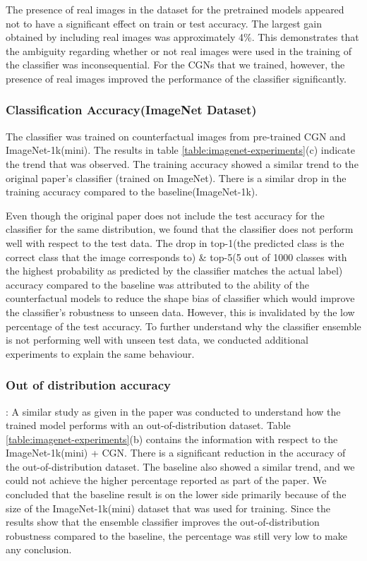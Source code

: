 The presence of real images in the dataset for the pretrained models appeared not to have a significant effect on train or test accuracy. The largest gain obtained by including real images was approximately 4\%. This demonstrates that the ambiguity regarding whether or not real images were used in the training of the classifier was inconsequential. For the CGNs that we trained, however, the presence of real images improved the performance of the classifier significantly. 


\subsubsection{Classification Accuracy(ImageNet Dataset)}

The classifier was trained on counterfactual images from pre-trained CGN and ImageNet-1k(mini). The results in table \ref{table:imagenet-experiments}(c) indicate the trend that was observed. 
The training accuracy showed a similar trend to the original paper's classifier (trained on ImageNet). There is a similar drop in the training accuracy compared to the baseline(ImageNet-1k). 

Even though the original paper does not include the test accuracy for the classifier for the same distribution, we found that the classifier does not perform well with respect to the test data. The drop in top-1(the predicted class is the correct class that the image corresponds to) \& top-5(5 out of 1000 classes with the highest probability as predicted by the classifier matches the actual label) accuracy compared to the baseline was attributed to the ability of the counterfactual models to reduce the shape bias of classifier which would improve the classifier's robustness to unseen data. However, this is invalidated by the low percentage of the test accuracy. To further understand why the classifier ensemble is not performing well with unseen test data, we conducted additional experiments to explain the same behaviour.

\subsubsection{Out of distribution accuracy}:
A similar study as given in the paper was conducted to understand how the trained model performs with an out-of-distribution dataset. Table \ref{table:imagenet-experiments}(b) contains the information with respect to the ImageNet-1k(mini) + CGN. There is a significant reduction in the accuracy of the out-of-distribution dataset. The baseline also showed a similar trend, and we could not achieve the higher percentage reported as part of the paper. 
We concluded that the baseline result is on the lower side primarily because of the size of the ImageNet-1k(mini) dataset that was used for training. Since the results show that the ensemble classifier improves the out-of-distribution robustness compared to the baseline, the percentage was still very low to make any conclusion.

